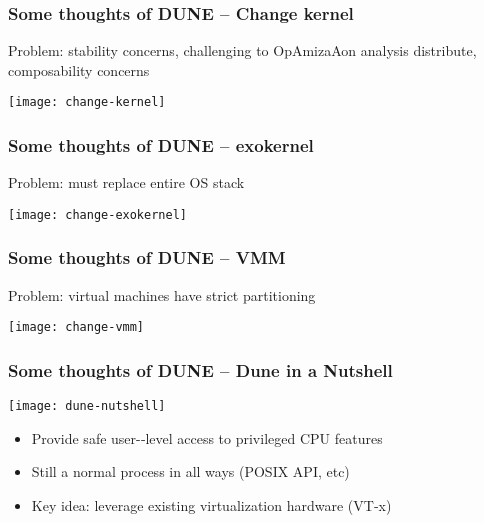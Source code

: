 \begin{frame}[plain]
	\frametitle{ Some thoughts of DUNE -- Change kernel}
	
			\centering
			\Large
			Problem:	
 stability	
 concerns,	
 challenging	
 to	
  OpAmizaAon	
 analysis
			distribute,	
 composability	
 concerns	
  
			
			\texttt{[image: change-kernel]}
			
	
	
\end{frame}


\begin{frame}[plain]
	\frametitle{ Some thoughts of DUNE -- exokernel}
	
	\centering
	\Large
	Problem:	 must	 replace	 entire	 OS	 stack	
  
	
	\texttt{[image: change-exokernel]}
	
	
	
\end{frame}


\begin{frame}[plain]
	\frametitle{ Some thoughts of DUNE -- VMM}
	
	\centering
	\Large
	Problem:	virtual	machines	have	strict	partitioning	
  
	
	\texttt{[image: change-vmm]}
	
	
	
\end{frame}


\begin{frame}[plain]
	\frametitle{ Some thoughts of DUNE -- Dune in a Nutshell}
	
	\centering
	
  
	
	\texttt{[image: dune-nutshell]}
	\centering
	\begin{itemize}
		\item Provide	 safe user-­‐level	 access	 to	 privileged	 CPU	 features
		\item Still  a	 normal	 process	 in	 all	 ways	 (POSIX	 API,	 etc)	
		\item Key
 idea:
 leverage existing virtualization hardware (VT‐x)	
  		
	\end{itemize}		
	
\end{frame}


